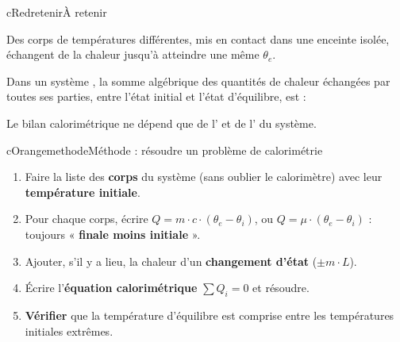 \begin{rub}[colback=cRed!4!white, boxrule=1.4pt, unbreakable]{cRed}{retenir}{À retenir}
\ifeleve\RaggedRight\fi
{}\par\smallskip
Des corps de températures différentes, mis en contact dans une enceinte isolée, échangent de la chaleur jusqu’à atteindre une même  $\theta_e$.\par\medskip
{}\par\smallskip
Dans un système , la somme algébrique des quantités de chaleur échangées par toutes ses parties, entre l’état initial et l’état d’équilibre, est  :
\begin{center}\end{center}
Le bilan calorimétrique ne dépend que de l’ et de l’ du système.
\end{rub}

\begin{encart}{cOrange}{methode}{Méthode : résoudre un problème de calorimétrie}
\begin{enumerate}[label={\sffamily\bfseries\color{cOrange}\arabic*.}, leftmargin=5mm, itemsep=0pt, topsep=1pt]
  \item Faire la liste des \textbf{corps} du système (sans oublier le calorimètre) avec leur \textbf{température initiale}.
  \item Pour chaque corps, écrire $Q = m\cdot c\cdot(\theta_e - \theta_i)$, ou $Q = \mu\cdot(\theta_e - \theta_i)$ : toujours « \textbf{finale moins initiale} ».
  \item Ajouter, s’il y a lieu, la chaleur d’un \textbf{changement d’état} ($\pm m\cdot L$).
  \item Écrire l’\textbf{équation calorimétrique} $\sum Q_i = 0$ et résoudre.
  \item \textbf{Vérifier} que la température d’équilibre est comprise entre les températures initiales extrêmes.
\end{enumerate}
\end{encart}

